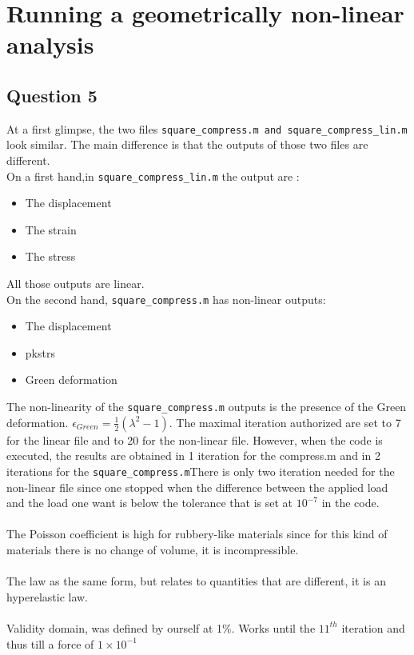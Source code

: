 \documentclass[12pt,a4paper]{article}
\begin{document}
\section*{Running a geometrically non-linear analysis}
\subsection*{Question 5}
At a first glimpse, the two files \verb|square_compress.m and square_compress_lin.m| look similar.
The main difference is that the outputs of those two files are different. 
\\On a first hand,in \verb|square_compress_lin.m| the output are :
\begin{itemize}
\item The displacement
\item The strain
\item The stress
\end{itemize}
All those outputs are linear.
\\On the second hand, \verb|square_compress.m| has non-linear outputs:
\begin{itemize}
\item The displacement
\item pkstrs
\item Green deformation
\end{itemize}
The non-linearity of the \verb|square_compress.m| outputs is the presence of the Green deformation.
$\epsilon_{Green}=\frac{1}{2}(\lambda^2 -1)$.
The maximal iteration authorized are set to 7 for the linear file and to 20 for the non-linear file. However, when the code is executed, the results are obtained in 1 iteration for the compress.m and in 2 iterations for the \verb|square_compress.m|There is only two iteration needed for the non-linear file since one stopped when the difference between the applied load and the load one want is below the tolerance that is set at $10^{-7}$ in the code.
\\
\\The Poisson coefficient is high for rubbery-like materials since for this kind of materials there is no change of volume, it is incompressible.
\\
\\The law as the same form, but relates to quantities that are different, it is an hyperelastic law.
\\
\\Validity domain, was defined by ourself at 1\%. Works until the $11^{th}$ iteration and thus till a force of $1\times 10^{-1}$
\end{document}
